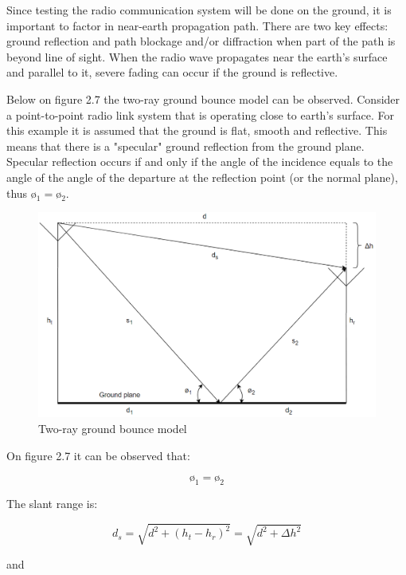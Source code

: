 
Since testing the radio communication system will be done on the ground, it is important to factor in near-earth propagation path. There are two key effects: ground reflection and path blockage and/or diffraction when part of the path is beyond line of sight. When the radio wave propagates near the earth's surface and parallel to it, severe fading can occur if the ground is reflective. 

Below on figure 2.7 the two-ray ground bounce model can be observed. Consider a point-to-point radio link system that is operating close to earth's surface. For this example it is assumed that the ground is flat, smooth and reflective. This means that there is a "specular" ground reflection\cite{specular} from the ground plane. Specular reflection occurs if and only if the angle of the incidence equals to the angle of the angle of the departure at the reflection point (or the normal plane), thus $ø_1 = ø_2$. 

\begin{figure}[h]
\hspace{-0.5cm}
\includegraphics[scale=0.6]{figures/TwoRay.PNG}
\caption{Two-ray ground bounce model}
\end{figure}

On figure 2.7 it can be observed that:

$$ø_1 = ø_2$$

The slant range is:

\begin{equation}
  d_s = \sqrt{d^2 + (h_t - h_r)^2}= \sqrt{d^2 + \Delta h^2}
\end{equation}

and 


